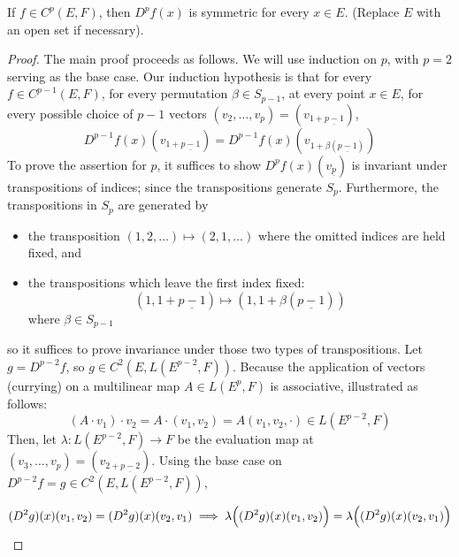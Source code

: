 \documentclass[../main-manifolds.tex]{subfiles}
\begin{document}
\begin{wts}
    If $f\in C^p(E,F)$, then $D^pf(x)$ is symmetric for every $x\in E$. (Replace $E$ with an open set if necessary).
\end{wts}
\begin{proof}
    The main proof proceeds as follows. We will use induction on $p$, with $p=2$ serving as the base case. Our induction hypothesis is that for every $f\in C^{p-1}(E,F)$, for every permutation $\beta\in S_{p-1}$, at every point $x\in E$, for every possible choice of $p-1$ vectors $(v_2,\ldots, v_{p}) = (v_{1 + \underline{p-1}})$,
    \[
        D^{p-1}f(x)(v_{1+\underline{p-1}}) = D^{p-1}f(x)(v_{1+\beta(\underline{p-1})})
    \]
    To prove the assertion for $p$, it suffices to show $D^pf(x)(v_{\underline{p}})$ is invariant under transpositions of indices; since the transpositions generate $S_p$. Furthermore, the transpositions in $S_p$ are generated by 
    
    \begin{itemize}
        \item the transposition $(1,2,\ldots)\mapsto (2,1,\ldots)$ where the omitted indices are held fixed, and
        \item the transpositions which leave the first index fixed:
        \[
            (1,1+\underline{p-1})\mapsto (1,1+\beta({\underline{p-1}}))
        \]
        where $\beta\in S_{p-1}$
    \end{itemize}

    so it suffices to prove invariance under those two types of transpositions. Let $g = D^{p-2}f$, so $g\in C^2(E, L(E^{p-2}, F))$. Because the application of vectors (currying) on a multilinear map $A\in L(E^p, F)$ is associative, illustrated as follows:
    \[
       (A\cdot v_1)\cdot v_2 = A\cdot (v_1,v_2) = A(v_1, v_2,\cdot)\in L(E^{p-2}, F)
    \]
    Then, let $\lambda: L(E^{p-2}, F)\to F$ be the evaluation map at $(v_3,\ldots, v_p) = (v_{2+\underline{p-2}})$. 
    Using the base case on $D^{p-2}f = g\in C^2(E, L(E^{p-2}, F))$, 

    \[
        (D^2g)(x)(v_1,v_2) = (D^2g)(x)(v_2,v_1)\implies \lambda\qty\Big((D^2g)(x)(v_1,v_2)) = \lambda\qty\Big((D^2g)(x)(v_2,v_1))
    \]


\end{proof}
\end{document}
